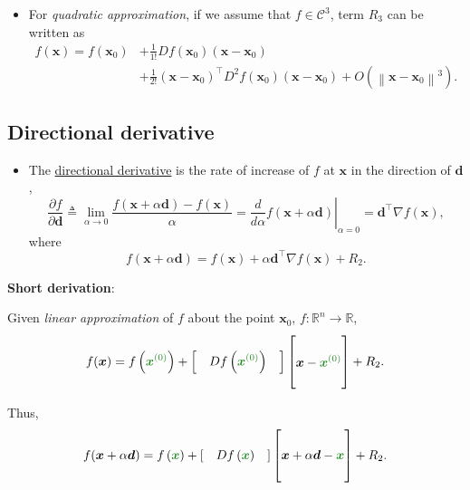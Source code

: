 \documentclass[12pt,thmsa]{article}
\begin{document}
\begin{itemize}
	\item For \textit{quadratic approximation}, if we assume that \(f \in \mathcal{C}^{3}\), term \(R_{3}\) can be written as
	\begin{align*}
		f(\boldsymbol{x})=f\left(\boldsymbol{x}_{0}\right)
		& + \frac{1}{1 !} D f\left(\boldsymbol{x}_{0}\right)\left(\boldsymbol{x}-\boldsymbol{x}_{0}\right) \\
		& + \frac{1}{2 !}\left(\boldsymbol{x}-\boldsymbol{x}_{0}\right)^{\top} D^{2} f\left(\boldsymbol{x}_{0}\right)\left(\boldsymbol{x}-\boldsymbol{x}_{0}\right)+O\left(\left\|\boldsymbol{x}-\boldsymbol{x}_{0}\right\|^{3}\right).
	\end{align*}

\end{itemize}


\subsection{Directional derivative}
\begin{itemize}
	\item The \underline{directional derivative} is the rate of increase of \(f\) at \(\boldsymbol{x}\) in the direction of \(\boldsymbol{d}\),
	\[
	\frac{\partial f}{\partial \boldsymbol{d}} \triangleq \lim _{\alpha \rightarrow 0} \frac{f(\boldsymbol{x}+\alpha \boldsymbol{d})-f(\boldsymbol{x})}{\alpha}
	=\left.\frac{d}{d \alpha} f(\boldsymbol{x}+\alpha \boldsymbol{d})\right|_{\alpha=0}=\boldsymbol{d}^{\top} \nabla f(\boldsymbol{x}),
	\]where
	\[
	f(\boldsymbol{x}+\alpha \boldsymbol{d})
	=f(\boldsymbol{x})+\alpha \boldsymbol{d}^{\top} \nabla f(\boldsymbol{x})+R_{2}.
	\]
\end{itemize}

\textbf{Short derivation}:

Given \textit{linear approximation} of \(f\) about the point \(\boldsymbol{x}_{0}\), \(f: \mathbb{R}^{n} \rightarrow \mathbb{R}\),
\[f(\boldsymbol{x})=f\left( { \color{forestgreen}{\boldsymbol{x}^{(0)}} } \right)+\left[\quad D f\left( { \color{forestgreen}{\boldsymbol{x}^{(0)}} } \right) \quad\right] 
\left[\begin{aligned} \\ \boldsymbol{x}-{ \color{forestgreen}{\boldsymbol{x}^{(0)}} } \\  \\\end{aligned}\right]
+R_{2}.
\]

Thus,
\[f( \boldsymbol{x}+ { \color{black}{ \alpha \boldsymbol{d}} } )=f\left( { \color{forestgreen}{\boldsymbol{x}} } \right)+\left[\quad D f\left( { \color{forestgreen}{\boldsymbol{x}} } \right) \quad\right] 
\left[\begin{aligned} \\ 
	\boldsymbol{x} + { \color{black}{ \alpha \boldsymbol{d}} } - { \color{forestgreen}{\boldsymbol{x}} } \\  \\ \end{aligned}\right]
+R_{2}.
\]
\end{document}
